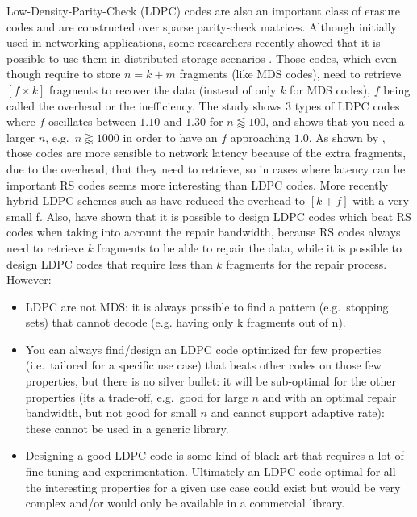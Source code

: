 \documentclass[oneside,9pt]{article}
\begin{document}
Low-Density-Parity-Check (LDPC) codes are also an important class of erasure codes and are constructed over sparse parity-check matrices. Although initially used in networking applications, some researchers recently showed that it is possible to use them in distributed storage scenarios \cite{plank_ldpc}. Those codes, which even though require to store $n=k+m$ fragments (like MDS codes), need to retrieve $[f \times k]$ fragments to recover the data (instead of only $k$ for MDS codes), $f$ being called the overhead or the inefficiency. The study \cite{plank_ldpc} shows 3 types of LDPC codes where $f$ oscillates between $1.10$ and $1.30$ for $n \lessapprox 100$, and shows that you need a larger $n$, e.g.\ $n \gtrapprox 1000$ in order to have an $f$ approaching $1.0$. As shown by \cite{plank_ldpc}, those codes are more sensible to network latency because of the extra fragments, due to the overhead, that they need to retrieve, so in cases where latency can be important RS codes seems more interesting than LDPC codes. More recently hybrid-LDPC schemes such as \cite{wirehair} have reduced the overhead to $[k + f]$ with a very small f. Also, \cite{park_ldpc} have shown that it is possible to design LDPC codes which beat RS codes when taking into account the repair bandwidth, because RS codes always need to retrieve $k$ fragments to be able to repair the data, while it is possible to design LDPC codes that require less than $k$ fragments for the repair process. However:
\begin{itemize}
\item LDPC are not MDS: it is always possible to find a pattern (e.g.\ stopping sets) that cannot decode (e.g. having only k fragments out of n).
\item You can always find/design an LDPC code optimized for few properties (i.e.\ tailored for a specific use case) that beats other codes on those few properties, but there is no silver bullet: it will be sub-optimal for the other properties (its a trade-off, e.g.\ good for large $n$ and with an optimal repair bandwidth, but not good for small $n$ and cannot support adaptive rate): these cannot be used in a generic library.
\item Designing a good LDPC code is some kind of black art that requires a lot of fine tuning and experimentation. Ultimately an LDPC code optimal for all the interesting properties for a given use case could exist but would be very complex and/or would only be available in a commercial library.
\end{itemize}
\end{document}
